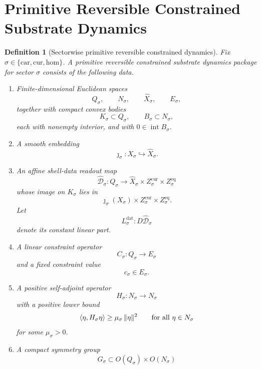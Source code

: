 \documentclass[11pt]{article}
\newcommand{\Car}{\mathrm{car}}
\newcommand{\Cur}{\mathrm{cur}}
\newcommand{\Hom}{\mathrm{hom}}
\newcommand{\VisibleAffine}[1]{\widehat X_{#1}}
\newcommand{\CoordSpace}[1]{Q_{#1}}
\newcommand{\CoordBody}[1]{K_{#1}}
\newcommand{\NormalSpace}[1]{N_{#1}}
\newcommand{\NormalBody}[1]{B_{#1}}
\newcommand{\AffineData}[1]{\widehat{\mathcal D}_{#1}}
\newcommand{\ConstraintMap}[1]{C_{#1}}
\newcommand{\ConstraintValue}[1]{c_{#1}}
\newcommand{\NormalOperator}[1]{H_{#1}}
\newcommand{\SymGroup}[1]{G_{#1}}
\newcommand{\LinearData}[1]{L_{#1}^{\mathrm{dat}}}
\newtheorem{definition}{Definition}
\begin{document}
\section{Primitive Reversible Constrained Substrate Dynamics}

\begin{definition}[Sectorwise primitive reversible constrained dynamics]
\label{def:primitive}
Fix \(\sigma\in\{\Car,\Cur,\Hom\}\). A \emph{primitive reversible constrained substrate dynamics package} for sector \(\sigma\) consists of the following data.
\begin{enumerate}
    \item Finite-dimensional Euclidean spaces
    \[
    \CoordSpace{\sigma},\qquad
    \NormalSpace{\sigma},\qquad
    \VisibleAffine{\sigma},\qquad
    E_{\sigma},
    \]
    together with compact convex bodies
    \[
    \CoordBody{\sigma}\subset \CoordSpace{\sigma},
    \qquad
    \NormalBody{\sigma}\subset \NormalSpace{\sigma},
    \]
    each with nonempty interior, and with \(0\in\operatorname{int}\NormalBody{\sigma}\).
    \item A smooth embedding
    \[
    \jmath_{\sigma}:X_{\sigma}\hookrightarrow \VisibleAffine{\sigma}.
    \]
    \item An affine shell-data readout map
    \[
    \AffineData{\sigma}:\CoordSpace{\sigma}\to
    \VisibleAffine{\sigma}\times Z_{\sigma}^{\mathrm{cur}}\times Z_{\sigma}^{\mathrm{eq}}
    \]
    whose image on \(\CoordBody{\sigma}\) lies in
    \[
    \jmath_{\sigma}(X_{\sigma})\times Z_{\sigma}^{\mathrm{cur}}\times Z_{\sigma}^{\mathrm{eq}}.
    \]
    Let
    \[
    \LinearData{\sigma}:D\AffineData{\sigma}
    \]
    denote its constant linear part.
    \item A linear constraint operator
    \[
    \ConstraintMap{\sigma}:\CoordSpace{\sigma}\to E_{\sigma}
    \]
    and a fixed constraint value
    \[
    \ConstraintValue{\sigma}\in E_{\sigma}.
    \]
    \item A positive self-adjoint operator
    \[
    \NormalOperator{\sigma}:\NormalSpace{\sigma}\to\NormalSpace{\sigma}
    \]
    with a positive lower bound
    \begin{equation}
    \ev{\eta,\NormalOperator{\sigma}\eta}\ge \mu_{\sigma}\,\|\eta\|^{2}
    \qquad
    \text{for all }\eta\in\NormalSpace{\sigma}
    \label{eq:Hlower}
    \end{equation}
    for some \(\mu_{\sigma}>0\).
    \item A compact symmetry group
    \[
    \SymGroup{\sigma}\subset O(\CoordSpace{\sigma})\times O(\NormalSpace{\sigma})
\]
\end{enumerate}
\end{definition}
\end{document}

